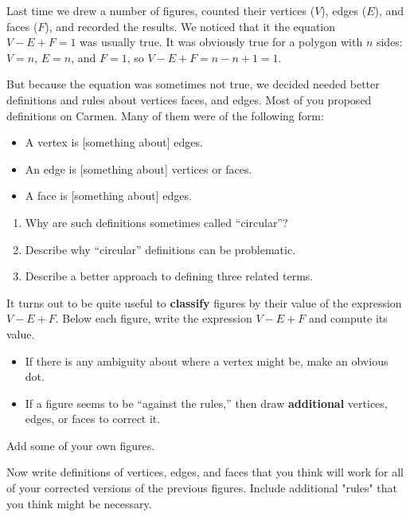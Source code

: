 \documentclass{ximera}
\begin{document}
\begin{question}
Last time we drew a number of figures, counted their vertices ($V$), edges ($E$), and faces ($F$), and recorded the results.  We noticed that it the equation $V-E+F=1$ was usually true.  It was obviously true for a polygon with $n$ sides: $V=n$, $E=n$, and $F=1$, so $V-E+F=n-n+1=1$.  

But because the equation was sometimes not true, we decided needed better definitions and rules about vertices faces, and edges.  Most of you proposed definitions on Carmen.  Many of them were of the following form: 
\begin{itemize}
\item A vertex is [something about] edges. 
\item An edge is [something about] vertices or faces. 
\item A face is [something about] edges. 
\end{itemize}
\begin{enumerate}
\item Why are such definitions sometimes called ``circular''?  
\item Describe why ``circular'' definitions can be problematic. 
\item Describe a better approach to defining three related terms.  
\end{enumerate}
\begin{freeResponse}
\end{freeResponse}
\vfill
\end{question}
\newpage

\begin{question}
It turns out to be quite useful to \textbf{classify} figures by their value of the expression 
$V-E+F$.  Below each figure, write the expression $V-E+F$ and compute its value.  
\begin{itemize}
\item If there is any ambiguity about where a vertex might be, make an obvious dot.  
\item If a figure seems to be ``against the rules,'' then draw \textbf{additional} vertices, edges, or faces to correct it.  
\end{itemize}
\vspace{0.5in}

Add some of your own figures.  
\begin{freeResponse}
\end{freeResponse}
\vfill
\end{question}

\newpage

\begin{question}
Now write definitions of vertices, edges, and faces that you think will work for all of your corrected versions of the previous figures.  Include additional "rules" that you think might be necessary.  
\begin{freeResponse}
\end{freeResponse}
\vfill
\end{question}
\end{document}
